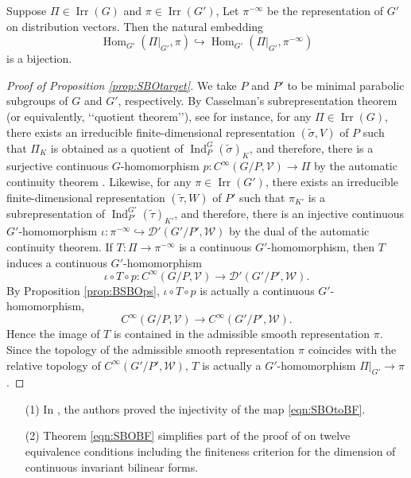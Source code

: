 \begin{proposition}
\label{prop:SBOtarget}
Suppose $\Pi \in {\operatorname{Irr}}(G)$
 and $\pi \in {\operatorname{Irr}}(G')$, 
Let $\pi^{-\infty}$ be the representation of $G'$
 on distribution vectors.  
Then the natural embedding
\[
   {\operatorname{Hom}}_{G'}(\Pi|_{G'}, \pi)
   \hookrightarrow
   {\operatorname{Hom}}_{G'}(\Pi|_{G'}, \pi^{-\infty})
\]
 is a bijection.  
\end{proposition}
\begin{proof}
[Proof of Proposition \ref{prop:SBOtarget}]
We take $P$ and $P'$ to be minimal parabolic subgroups of $G$ and $G'$, 
 respectively.  
By Casselman's subrepresentation theorem
 (or equivalently, \lq\lq{quotient theorem}\rq\rq), 
 see \cite[Chap.~3, Sect.~8]{W} for instance,
 for any $\Pi \in {\operatorname{Irr}}(G)$, 
 there exists an irreducible finite-dimensional representation
 $(\widetilde \sigma, V)$ of $P$
 such that
 $\Pi_K$ is obtained as a quotient
 of ${\operatorname{Ind}}_P^{G}(\widetilde \sigma)_K$, 
 and therefore,
 there is a surjective continuous $G$-homomorphism
$p \colon C^{\infty}(G/P, {\mathcal{V}}) \to \Pi$
 by the automatic continuity theorem
 \cite[Chap.~11, Sect.~4]{W}.  
Likewise, 
 for any $\pi \in {\operatorname{Irr}}(G')$, 
 there exists an irreducible finite-dimensional representation
 $(\widetilde \tau, W)$ of $P'$
 such that
 $\pi_{K'}$ is a subrepresentation of 
 ${\operatorname{Ind}}_{P'}^{G'}(\widetilde \tau)_{K'}$,
 and therefore, 
 there is an injective continuous $G'$-homomorphism
$\iota \colon \pi^{-\infty} \hookrightarrow {\mathcal{D}}'(G'/P', {\mathcal{W}})$
 by the dual of the automatic continuity theorem.  
If $T \colon \Pi \to\pi^{-\infty}$ is a continuous $G'$-homomorphism, 
 then $T$ induces a continuous $G'$-homomorphism
\[
  \iota\circ T \circ p \colon C^{\infty}(G/P, {\mathcal{V}}) \to {\mathcal{D}}'(G'/P', {\mathcal{W}}).  
\] 
By Proposition \ref{prop:BSBOps}, 
 $\iota\circ T \circ p$ is actually a continuous $G'$-homomorphism, 
\[
  C^{\infty}(G/P, {\mathcal{V}}) \to C^{\infty}(G'/P', {\mathcal{W}}).  
\] 
Hence the image of $T$ is contained in the admissible smooth representation $\pi$.  
Since the topology of the admissible smooth representation $\pi$ coincides
 with the relative topology of $C^{\infty}(G'/P', {\mathcal{W}})$, 
 $T$ is actually a $G'$-homomorphism $\Pi|_{G'} \to \pi$.  
\end{proof}

\begin{remark}
\begin{enumerate}
\item[{\rm{(1)}}]
In \cite[Lem.~A.0.8]{AG},
 the authors proved 
 the injectivity of the map \eqref{eqn:SBOtoBF}.  
\item[{\rm{(2)}}]
Theorem \ref{eqn:SBOBF} simplifies
 part of the proof
 of \cite[Thm.~4.1]{xkShintani}
 on twelve equivalence conditions
 including the finiteness
 criterion for the dimension
 of continuous invariant bilinear forms.  
\end{enumerate}
\end{remark}

